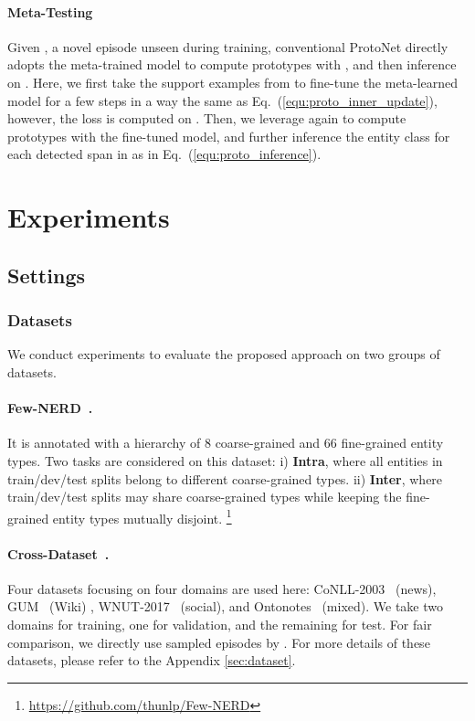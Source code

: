 \documentclass[11pt]{article}
\begin{document}
\paragraph{Meta-Testing} Given , a novel episode unseen during training, conventional ProtoNet directly adopts the meta-trained model to compute prototypes with , and then inference on .
Here, we first take the support examples from  to fine-tune the meta-learned model  for a few steps in a way the same as Eq.~(\ref{equ:proto_inner_update}), however, the loss is computed on .
Then, we leverage  again to compute prototypes with the fine-tuned model, and further inference the entity class for each detected span in  as in Eq.~(\ref{equ:proto_inference}).


\section{Experiments}
\subsection{Settings}
\subsubsection{Datasets} We conduct experiments to evaluate the proposed approach on two groups of datasets.
\paragraph{Few-NERD~\citep{ding2021nerd}.} It is annotated with a hierarchy of 8 coarse-grained and 66 fine-grained entity types.
Two tasks are considered on this dataset:
i) \textbf{Intra}, where all entities in train/dev/test splits belong to different coarse-grained types.
ii) \textbf{Inter}, where train/dev/test splits may share coarse-grained types while keeping the fine-grained entity types mutually disjoint.
\footnote{\url{https://github.com/thunlp/Few-NERD}}

\paragraph{Cross-Dataset~\citep{hou2020few}.} Four datasets focusing on four domains are used here: CoNLL-2003~\citep{tjong2003introduction} (news), GUM~\citep{zeldes2017gum} (Wiki) , WNUT-2017~\citep{derczynski2017results} (social), and Ontonotes~\citep{pradhan2013towards} (mixed). We take two domains for training, one for validation, and the remaining for test. For fair comparison, we directly use sampled episodes by \citet{hou2020few}.
For more details of these datasets, please refer to the Appendix \ref{sec:dataset}.
\end{document}
